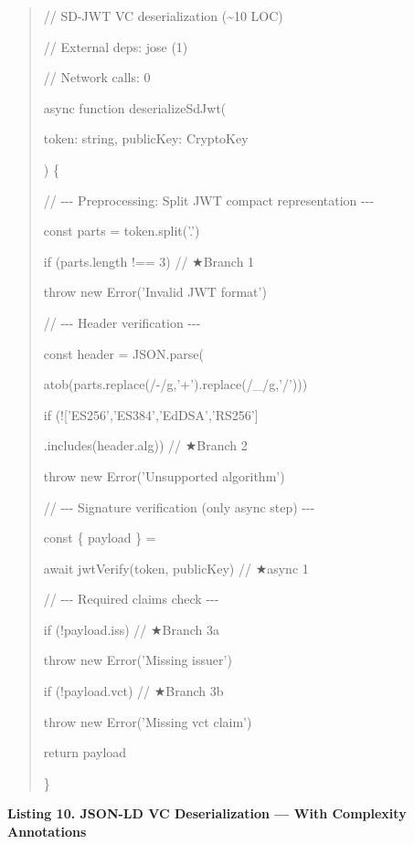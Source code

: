 \documentclass[conference]{IEEEtran}
\begin{document}
\begin{quote}
// SD-JWT VC deserialization (\textasciitilde10 LOC)

// External deps: jose (1)

// Network calls: 0

async function deserializeSdJwt(

token: string, publicKey: CryptoKey

) \{

// -\/-\/- Preprocessing: Split JWT compact representation -\/-\/-

const parts = token.split('.')

if (parts.length !== 3) // ★Branch 1

throw new Error('Invalid JWT format')

// -\/-\/- Header verification -\/-\/-

const header = JSON.parse(

atob(parts\cite{ref0}.replace(/-/g,'+').replace(/\_/g,'/')))

if (!{[}'ES256','ES384','EdDSA','RS256'{]}

.includes(header.alg)) // ★Branch 2

throw new Error('Unsupported algorithm')

// -\/-\/- Signature verification (only async step) -\/-\/-

const \{ payload \} =

await jwtVerify(token, publicKey) // ★async 1

// -\/-\/- Required claims check -\/-\/-

if (!payload.iss) // ★Branch 3a

throw new Error('Missing issuer')

if (!payload.vct) // ★Branch 3b

throw new Error('Missing vct claim')

return payload

\}
\end{quote}

\textbf{Listing 10. JSON-LD VC Deserialization --- With Complexity Annotations}
\end{document}

